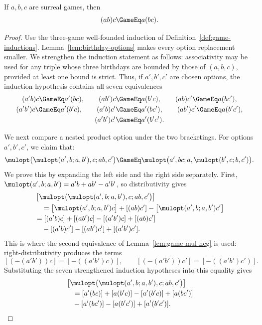 \begin{theorem}
  \label{thm:game-mul-assoc}
  \leanok
  If \(a,b,c\) are surreal games, then
  \[
    (ab)c\GameEq a(bc).
  \]
\end{theorem}
\begin{proof}
  \leanok
  Use the three-game well-founded induction of
  Definition~\ref{def:game-inductions}.  Lemma~\ref{lem:birthday-options}
  makes every option replacement smaller.  We strengthen the induction
  statement as follows: associativity may be used for any triple whose three
  birthdays are bounded by those of \((a,b,c)\), provided at least one bound
  is strict.  Thus, if \(a',b',c'\) are chosen options, the induction
  hypothesis contains all seven equivalences
  \[
    \begin{gathered}
      (a'b)c\GameEq a'(bc),\qquad
      (ab')c\GameEq a(b'c),\qquad
      (ab)c'\GameEq a(bc'),\\
      (a'b')c\GameEq a'(b'c),\qquad
      (a'b)c'\GameEq a'(bc'),\qquad
      (ab')c'\GameEq a(b'c'),\\
      (a'b')c'\GameEq a'(b'c').
    \end{gathered}
  \]

  We next compare a nested product option under the two bracketings.  For
  options \(a',b',c'\), we claim that:
  \[
    \mulopt\bigl(\mulopt(a',b;a,b'),c;ab,c'\bigr)
      \GameEq
    \mulopt\bigl(a',bc;a,\mulopt(b',c;b,c')\bigr).
  \]
  We prove this by expanding the left side and the right side separately.
  First, \(\mulopt(a',b;a,b')=a'b+ab'-a'b'\), so distributivity gives
  \[
    \begin{aligned}
      &\left[
        \mulopt\bigl(\mulopt(a',b;a,b'),c;ab,c'\bigr)
      \right]\\
      &\quad=
        \bigl[\mulopt(a',b;a,b')c\bigr]+[(ab)c']
          -\bigl[\mulopt(a',b;a,b')c'\bigr]\\
        &=[(a'b)c]+[(ab')c]-[(a'b')c]+[(ab)c']\\
        &\quad-[(a'b)c']-[(ab')c']+[(a'b')c'].
    \end{aligned}
  \]
  This is where the second equivalence of Lemma~\ref{lem:game-mul-neg} is
  used: right-distributivity produces the terms
  \[
    [(-(a'b'))c]
      =[-((a'b')c)],
    \qquad
    [(-(a'b'))c']
      =[-((a'b')c')].
  \]
  Substituting the seven strengthened induction hypotheses into this equality
  gives
  \[
    \begin{aligned}
      &\left[
        \mulopt\bigl(\mulopt(a',b;a,b'),c;ab,c'\bigr)
      \right]\\
        &\quad=[a'(bc)]+[a(b'c)]-[a'(b'c)]+[a(bc')]\\
        &\quad-[a'(bc')]-[a(b'c')]+[a'(b'c')].
    \end{aligned}
  \]


\end{proof}
